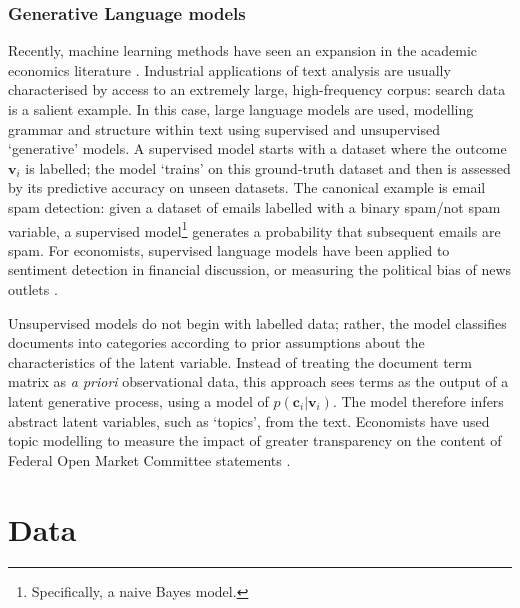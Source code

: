 \documentclass{article}
\begin{document}
\subsubsection{Generative Language models}
Recently, machine learning methods have seen an expansion in the academic economics literature \parencite{atheyMachineLearningMethods2019a}. Industrial applications of text analysis are usually characterised by access to an extremely large, high-frequency corpus: search data is a salient example. In this case, large language models are used, modelling grammar and structure within text using supervised and unsupervised `generative' models. A supervised model starts with a dataset where the outcome \(\mathbf{v}_i\) is labelled; the model `trains' on this ground-truth dataset and then is assessed by its predictive accuracy on unseen datasets. The canonical example is email spam detection: given a dataset of emails labelled with a binary spam/not spam variable, a supervised model\footnote{Specifically, a naive Bayes model.} generates a probability that subsequent emails are spam. For economists, supervised language models have been applied to sentiment detection in financial discussion, or measuring the political bias of news outlets \parencite{grosecloseMeasureMediaBias2005}.

Unsupervised models do not begin with labelled data; rather, the model classifies documents into categories according to prior assumptions about the characteristics of the latent variable. Instead of treating the document term matrix as \textit{a priori} observational data, this approach sees terms as the output of a latent generative process, using a model of \(p(\mathbf{c}_i|\mathbf{v}_i)\). The model therefore infers abstract latent variables, such as `topics', from the text. Economists have used topic modelling to measure the impact of greater transparency on the content of Federal Open Market Committee statements \parencite{hansenTransparencyDeliberationFOMC2018}.



\section{Data} %
\end{document}
